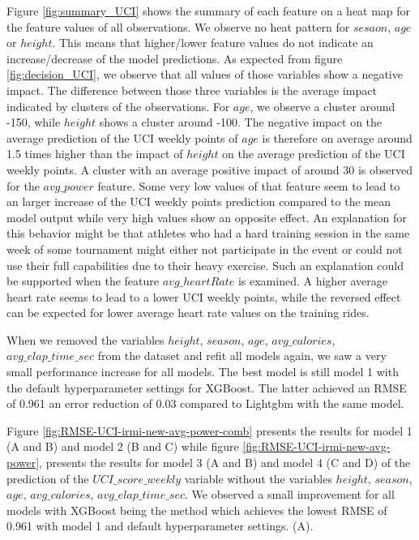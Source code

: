 \documentclass[12pt,a4paper]{article}
\begin{document}
Figure \ref{fig:summary_UCI} shows the summary of each feature on a heat map for the feature values of all observations. We observe no heat pattern for \(sesaon\), \(age\) or \(height\). This means that higher/lower feature values do not indicate an increase/decrease of the model predictions. As expected from figure \ref{fig:decision_UCI}, we observe that all values of those
variables show a negative impact. The difference between those three variables is the average impact indicated by clusters of the observations. For \(age\), we observe a cluster around -150, while \(height\) shows a cluster around -100. The negative impact on the average prediction of the UCI weekly points of \(age\) is therefore on average around 1.5 times higher than the impact of \(height\) on the average prediction of the UCI weekly points. A cluster with an average positive impact of around 30 is observed for the \(avg\_power\) feature. Some very low values of that feature seem to lead to an larger increase of the UCI weekly points prediction compared to the mean model output while very high values show an opposite effect. An explanation for this behavior might be that athletes who had a hard training session in the same week of some tournament might either not participate in the event or could not use their full capabilities due to their heavy exercise. Such an explanation could be supported when the feature \(avg\_heartRate\) is examined. A higher average heart rate seems to lead to a lower UCI weekly points, while the reversed effect can be expected for lower average heart rate values on the training rides.

When we removed the variables \(height\), \(season\), \(age\), \(avg\_calories\), \(avg\_elap\_time\_sec\) from the dataset and refit all models again, we saw a very small performance increase for all models. The best model is still model 1 with the default hyperparameter settings for XGBoost. The latter achieved an RMSE of 0.961 an error reduction of 0.03 compared to Lightgbm with the same model.

Figure \ref{fig:RMSE-UCI-irmi-new-avg-power-comb} presents the results for model 1 (A and B) and model 2 (B and C) while figure \ref{fig:RMSE-UCI-irmi-new-avg-power}, presents the results for model 3 (A and B) and model 4 (C and D) of the prediction of the \(UCI\_score\_weekly\) variable without the variables \(height\), \(season\), \(age\), \(avg\_calories\), \(avg\_elap\_time\_sec\). We observed a small improvement for all models with XGBoost being the method which achieves the lowest RMSE of 0.961 with model 1 and default hyperparameter settings. (A).
\end{document}

